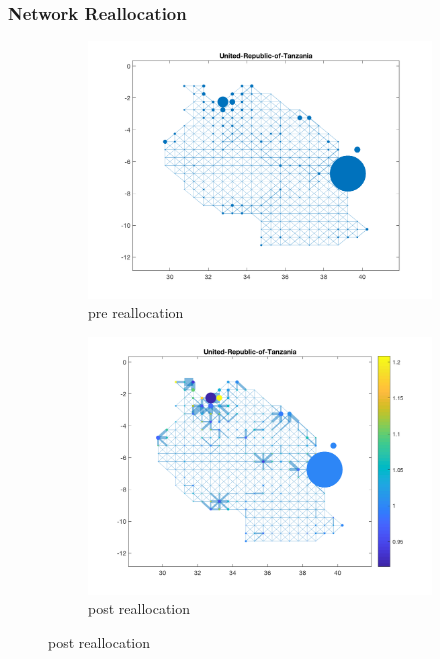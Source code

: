 \documentclass[]{beamer}   	%
\begin{document}
\begin{frame}
  \frametitle{Network Reallocation}

\begin{figure}
\begin{subfigure}[c]{0.48\textwidth}
\includegraphics[width=\textwidth, trim={2cm 1cm 1.5cm 0cm},clip]{../../Build/output/Matlab_graphs/Nicer_graphs/United-Republic-of-Tanzania_stat.png}
\caption{pre reallocation}
\label{fig:cae_pre}
\end{subfigure}
\begin{subfigure}[c]{0.48\textwidth}
\includegraphics[width=\textwidth, trim={2cm 1cm 1.5cm 0cm},clip]{../../Build/output/Matlab_graphs/Nicer_graphs/United-Republic-of-Tanzania_opt.png}
\caption{post reallocation}
\label{fig:cae_post}
\end{subfigure}
\end{figure}
\end{frame}
\end{document}
